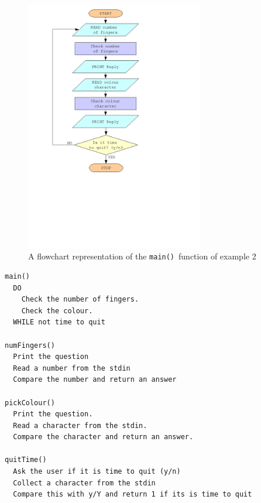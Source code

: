 \documentclass[11pt]{scrartcl}
\def\main{\texttt{main()}}
\begin{document}
\begin{figure}[h]
\begin{center}
\includegraphics[height=11cm]{figures/ex2}
\caption{A flowchart representation of the \main\ function of example 2
\label{figure:flowchart_ex2}}
\end{center}
\end{figure}

\begin{pseudocode}[h]
\begin{verbatim}
main()
  DO
    Check the number of fingers.
    Check the colour.
  WHILE not time to quit

numFingers()
  Print the question
  Read a number from the stdin
  Compare the number and return an answer

pickColour()
  Print the question.
  Read a character from the stdin.
  Compare the character and return an answer.

quitTime()
  Ask the user if it is time to quit (y/n)
  Collect a character from the stdin
  Compare this with y/Y and return 1 if its is time to quit
\end{verbatim}
\caption{A pseudocode representation of example 2 \label{pseudo:ex2}}
\end{pseudocode}
\end{document}
